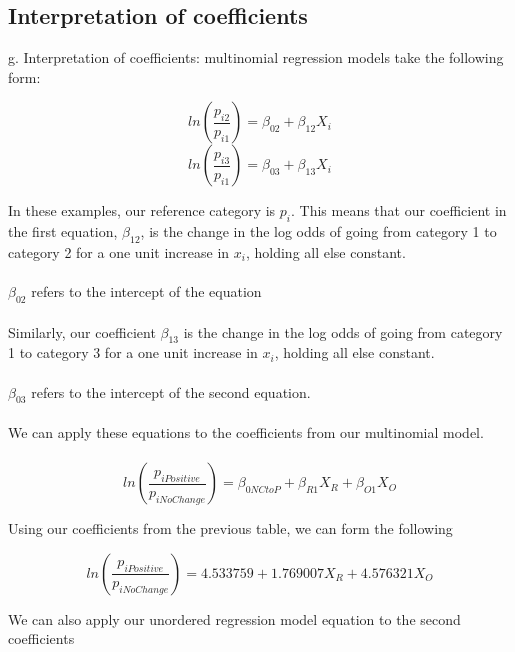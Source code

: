 \documentclass[12pt,letterpaper]{article}
\begin{document}
\pagebreak

\subsection{Interpretation of coefficients}

\noindent g. Interpretation of coefficients: multinomial regression models take the following form: 

\begin{equation}
ln(\frac{p_{i2}}{p_{i1}}) = \beta_{02} + \beta_{12}X_i 
\end{equation}
\begin{equation}
ln(\frac{p_{i3}}{p_{i1}}) = \beta_{03} + \beta_{13}X_i 
\end{equation}

\noindent In these examples, our reference category is \texttt{$p_i$}. This means that our coefficient in the first equation, $\beta_{12}$, is the change in the log odds of going from category 1 to category 2 for a one unit increase in $x_i$, holding all else constant. 
\\\\
\noindent $\beta_{02}$ refers to the intercept of the equation
\\\\
\noindent
Similarly, our coefficient $\beta_{13}$ is the change in the log odds of going from category 1 to category 3 for a one unit increase in $x_i$, holding all else constant.
\\\\
\noindent $\beta_{03}$ refers to the intercept of the second equation.
\\\\
\noindent
We can apply these equations to the coefficients from our multinomial model.
\\\\
\begin{equation}
ln(\frac{p_{iPositive}}{p_{iNoChange}}) = \beta_{0NCtoP} + \beta_{R1}X_{R} + \beta_{O1}X_{O} 
\end{equation}

\noindent 
Using our coefficients from the previous table, we can form the following 

\begin{equation}
ln(\frac{p_{iPositive}}{p_{iNoChange}}) = 4.533759 + 1.769007X_{R} + 4.576321X_{O} 
\end{equation}


\noindent We can also apply our unordered regression model equation to the second coefficients
\end{document}
